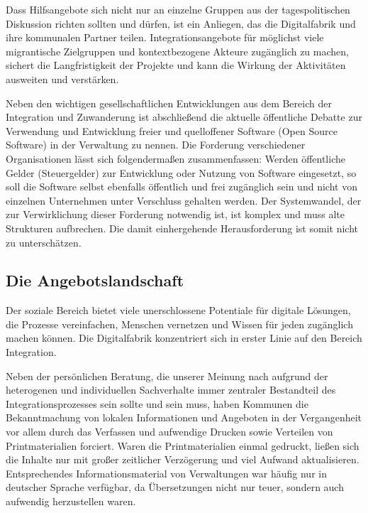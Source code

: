 \documentclass[12pt, a4paper]{article} %
\begin{document}
Dass Hilfsangebote sich nicht nur an einzelne Gruppen aus der
tagespolitischen Diskussion richten sollten und dürfen, ist ein
Anliegen, das die Digitalfabrik und ihre kommunalen Partner teilen.
Integrationsangebote für möglichst viele migrantische Zielgruppen und
kontextbezogene Akteure zugänglich zu machen, sichert die
Langfristigkeit der Projekte und kann die Wirkung der Aktivitäten
ausweiten und verstärken.

Neben den wichtigen gesellschaftlichen Entwicklungen aus dem Bereich der
Integration und Zuwanderung ist abschließend die aktuelle öffentliche
Debatte zur Verwendung und Entwicklung freier und quelloffener Software
(Open Source Software) in der Verwaltung zu nennen. Die Forderung
verschiedener Organisationen lässt sich folgendermaßen zusammenfassen:
Werden öffentliche Gelder (Steuergelder) zur Entwicklung oder Nutzung
von Software eingesetzt, so soll die Software selbst ebenfalls
öffentlich und frei zugänglich sein und nicht von einzelnen Unternehmen
unter Verschluss gehalten werden. Der Systemwandel, der zur
Verwirklichung dieser Forderung notwendig ist, ist komplex und muss alte
Strukturen aufbrechen. Die damit einhergehende Herausforderung ist somit
nicht zu unterschätzen.

\hypertarget{die-angebotslandschaft}{%
\subsection{Die Angebotslandschaft}\label{die-angebotslandschaft}}

Der soziale Bereich bietet viele unerschlossene Potentiale für digitale
Lösungen, die Prozesse vereinfachen, Menschen vernetzen und Wissen für
jeden zugänglich machen können. Die Digitalfabrik konzentriert sich in
erster Linie auf den Bereich Integration.

Neben der persönlichen Beratung, die unserer Meinung nach aufgrund der
heterogenen und individuellen Sachverhalte immer zentraler Bestandteil
des Integrationsprozesses sein sollte und sein muss, haben Kommunen die
Bekanntmachung von lokalen Informationen und Angeboten in der
Vergangenheit vor allem durch das Verfassen und aufwendige Drucken sowie
Verteilen von Printmaterialien forciert. Waren die Printmaterialien
einmal gedruckt, ließen sich die Inhalte nur mit großer zeitlicher
Verzögerung und viel Aufwand aktualisieren. Entsprechendes
Informationsmaterial von Verwaltungen war häufig nur in deutscher
Sprache verfügbar, da Übersetzungen nicht nur teuer, sondern auch
aufwendig herzustellen waren.
\end{document}
